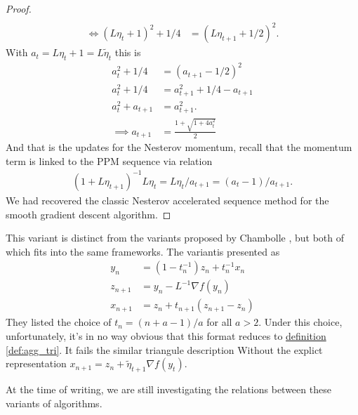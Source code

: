 \documentclass[12pt]{article}
\begin{document}
\begin{proof}
\begin{align*}
                \\
                \iff 
                (L\eta_t + 1)^2 + 1/4 &= 
                (L \eta_{t + 1} + 1/2)^2. 
            \end{align*}
            With $a_t = L\eta_t + 1 = L \tilde \eta_t$ this is 
            \begin{align*}
                a_t^2 + 1/4 &= (a_{t + 1} - 1/2)^2 
                \\
                a_t^2 + 1/4 &= a_{t + 1}^2 + 1/4 - a_{t + 1}
                \\
                a_t^2 + a_{t + 1} &= a_{t + 1}^2. 
                \\
                \implies 
                a_{t + 1} &= 
                \frac{1 + \sqrt{1 + 4a_t^2}}{2}
            \end{align*}
            And that is the updates for the Nesterov momentum, recall that the momentum term is linked to the PPM sequence via relation 
            \begin{align*}
                (1 + L \eta_{t+ 1})^{-1}L\eta_t = L\eta_t / a_{t + 1} = (a_t - 1)/a_{t + 1}. 
            \end{align*}
            We had recovered the classic Nesterov accelerated sequence method for the smooth gradient descent algorithm. 
        \end{proof}
        \begin{remark}
            This variant is distinct from the variants proposed by Chambolle \cite{chambolle_convergence_2015}, but both of which fits into the same frameworks. 
            The variantis presented as 
            \begin{align*}
                y_n &= (1 - t_n^{-1})z_n + t_n^{-1} x_n
                \\
                z_{n + 1} &= y_n - L^{-1}\nabla f(y_n)
                \\
                x_{n + 1} &= z_n + t_{n + 1}(z_{n + 1} - z_n)
            \end{align*}
            They listed the choice of $t_n = (n + a - 1)/a$ for all $a > 2$. 
            Under this choice, unfortunately, it's in no way obvious that this format reduces to \hyperref[def:agg_tri]{definition \ref*{def:agg_tri}}. 
            It fails the similar triangule description Without the explict representation $x_{n + 1} = z_n + \tilde\eta_{t + 1}\nabla f(y_t)$. 
            \par\noindent
            At the time of writing, we are still investigating the relations between these variants of algorithms.
        \end{remark}
        
\end{document}
